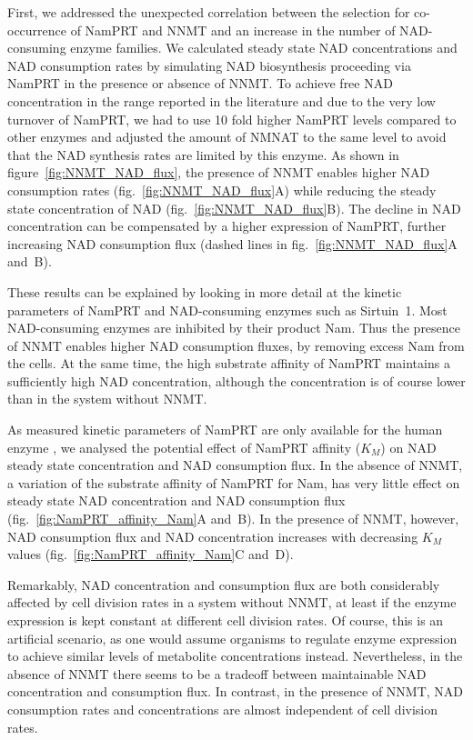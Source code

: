 First, we addressed the unexpected correlation between the selection for co-occurrence of NamPRT and NNMT and an increase in the number of NAD-consuming enzyme families. We calculated steady state NAD concentrations and NAD consumption rates by simulating NAD biosynthesis proceeding via NamPRT in the presence or absence of NNMT. To achieve free NAD concentration in the range reported in the literature and due to the very low turnover of NamPRT, we had to use 10 fold higher NamPRT levels compared to other enzymes and adjusted the amount of NMNAT to the same level to avoid that the NAD synthesis rates are limited by this enzyme.  As shown in figure~\ref{fig:NNMT_NAD_flux}, the presence of NNMT enables higher NAD consumption rates (fig.~\ref{fig:NNMT_NAD_flux}A) while reducing the steady state concentration of NAD (fig.~\ref{fig:NNMT_NAD_flux}B). The decline in NAD concentration can be compensated by a higher expression of NamPRT, further increasing NAD consumption flux (dashed lines in fig.~\ref{fig:NNMT_NAD_flux}A and~B).

These results can be explained by looking in more detail at the kinetic parameters of NamPRT and NAD-consuming enzymes such as Sirtuin~1. Most NAD-consuming enzymes are inhibited by their product Nam. Thus the presence of NNMT enables higher NAD consumption fluxes, by removing excess Nam from the cells. At the same time, the high substrate affinity of NamPRT maintains a sufficiently high NAD concentration, although the concentration is of course lower than in the system without NNMT.

As measured kinetic parameters of NamPRT are only available for the human enzyme \cite{Burgos2008}, we analysed the potential effect of NamPRT affinity ($K_{M}$) on NAD steady state concentration and NAD consumption flux. In the absence of NNMT, a variation of the substrate affinity of NamPRT for Nam, has very little effect on steady state NAD concentration and NAD consumption flux (fig.~\ref{fig:NamPRT_affinity_Nam}A and~B). In the presence of NNMT, however, NAD consumption flux and NAD concentration increases with decreasing $K_{M}$ values (fig.~\ref{fig:NamPRT_affinity_Nam}C and~D).

Remarkably, NAD concentration and consumption flux are both considerably affected by cell division rates in a system without NNMT, at least if the enzyme expression is kept constant at different cell division rates. Of course, this is an artificial scenario, as one would assume organisms to regulate enzyme expression to achieve similar levels of metabolite concentrations instead. Nevertheless, in the absence of NNMT there seems to be a tradeoff between maintainable NAD concentration and consumption flux. In contrast, in the presence of NNMT, NAD consumption rates and concentrations are almost independent of cell division rates.

